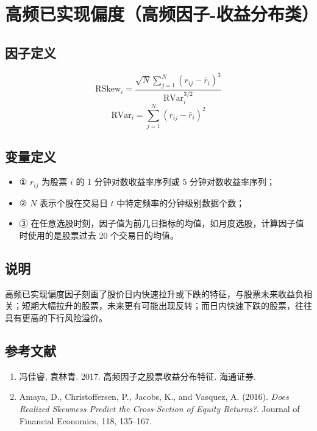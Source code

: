 \documentclass{article}
\begin{document}
\section{高频已实现偏度（高频因子-收益分布类）}

\subsection{因子定义}
\begin{equation}
    \mathrm{RSkew}_i = \frac{\sqrt{N} \sum_{j=1}^N (r_{ij} - \bar{r}_i)^3}{\mathrm{RVar}_i^{3/2}}
\end{equation}
\begin{equation}
    \mathrm{RVar}_i = \sum_{j=1}^N (r_{ij} - \bar{r}_i)^2
\end{equation}

\subsection{变量定义}
\begin{itemize}
    \item ① \( r_{ij} \) 为股票 \( i \) 的 1 分钟对数收益率序列或 5 分钟对数收益率序列；
    \item ② \( N \) 表示个股在交易日 \( t \) 中特定频率的分钟级别数据个数；
    \item ③ 在任意选股时刻，因子值为前几日指标的均值，如月度选股，计算因子值时使用的是股票过去 20 个交易日的均值。
\end{itemize}

\subsection{说明}
高频已实现偏度因子刻画了股价日内快速拉升或下跌的特征，与股票未来收益负相关；短期大幅拉升的股票，未来更有可能出现反转；而日内快速下跌的股票，往往具有更高的下行风险溢价。

\subsection{参考文献}
\begin{enumerate}
    \item 冯佳睿, 袁林青. 2017. 高频因子之股票收益分布特征. 海通证券.
    \item Amaya, D., Christoffersen, P., Jacobs, K., and Vasquez, A. (2016). \textit{Does Realized Skewness Predict the Cross-Section of Equity Returns?}. Journal of Financial Economics, 118, 135–167.
\end{enumerate}
\end{document}

